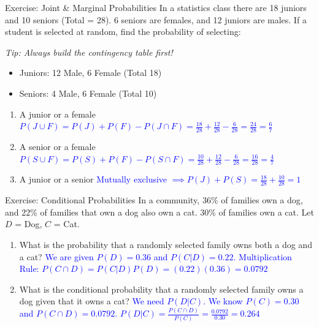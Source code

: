 \documentclass[aspectratio=169]{beamer}
\begin{document}
\begin{frame}{Exercise: Joint & Marginal Probabilities}
    In a statistics class there are 18 juniors and 10 seniors (Total = 28). 6 seniors are females, and 12 juniors are males. If a student is selected at random, find the probability of selecting:
    
    \pause
    \textit{Tip: Always build the contingency table first!}
    \begin{itemize}
        \item Juniors: 12 Male, 6 Female (Total 18)
        \item Seniors: 4 Male, 6 Female (Total 10)
    \end{itemize}
    \pause
    
    \begin{enumerate}
        \item A junior or a female \pause
        \newline \textcolor{blue}{$P(J \cup F) = P(J) + P(F) - P(J \cap F) = \frac{18}{28} + \frac{12}{28} - \frac{6}{28} = \frac{24}{28} = \frac{6}{7}$} \pause
        
        \item A senior or a female \pause
        \newline \textcolor{blue}{$P(S \cup F) = P(S) + P(F) - P(S \cap F) = \frac{10}{28} + \frac{12}{28} - \frac{6}{28} = \frac{16}{28} = \frac{4}{7}$} \pause
        
        \item A junior or a senior \pause
        \newline \textcolor{blue}{Mutually exclusive $\implies P(J) + P(S) = \frac{18}{28} + \frac{10}{28} = 1$}
    \end{enumerate}
\end{frame}

\begin{frame}{Exercise: Conditional Probabilities}
    In a community, 36\% of families own a dog, and 22\% of families that own a dog also own a cat. 30\% of families own a cat. Let $D$ = Dog, $C$ = Cat.
    \vspace{0.2cm}
    
    \begin{enumerate}
        \item What is the probability that a randomly selected family owns both a dog and a cat? \pause
        \newline \textcolor{blue}{We are given $P(D) = 0.36$ and $P(C|D) = 0.22$.}
        \newline \textcolor{blue}{Multiplication Rule: $P(C \cap D) = P(C|D)P(D) = (0.22)(0.36) = 0.0792$} \pause
        \vspace{0.3cm}
        \item What is the conditional probability that a randomly selected family owns a dog given that it owns a cat? \pause
        \newline \textcolor{blue}{We need $P(D|C)$. We know $P(C) = 0.30$ and $P(C \cap D) = 0.0792$.}
        \newline \textcolor{blue}{$P(D|C) = \frac{P(C \cap D)}{P(C)} = \frac{0.0792}{0.30} = 0.264$}
    \end{enumerate}
\end{frame}
\end{document}
